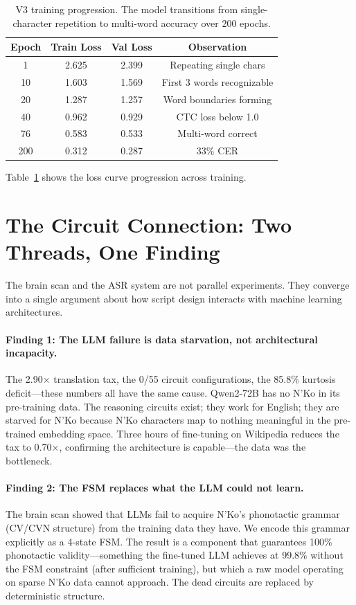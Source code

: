 \documentclass[11pt]{article}
\begin{document}
\begin{table}[t]
\centering
\small
\begin{tabular}{cccc}
\toprule
\textbf{Epoch} & \textbf{Train Loss} & \textbf{Val Loss} & \textbf{Observation} \\
\midrule
1 & 2.625 & 2.399 & Repeating single chars \\
10 & 1.603 & 1.569 & First 3 words recognizable \\
20 & 1.287 & 1.257 & Word boundaries forming \\
40 & 0.962 & 0.929 & CTC loss below 1.0 \\
76 & 0.583 & 0.533 & Multi-word correct \\
200 & 0.312 & 0.287 & 33\% CER \\
\bottomrule
\end{tabular}
\caption{V3 training progression. The model transitions from single-character repetition to multi-word accuracy over 200 epochs.}
\label{tab:loss-curve}
\end{table}

Table~\ref{tab:loss-curve} shows the loss curve progression across training.

\section{The Circuit Connection: Two Threads, One Finding}

The brain scan and the ASR system are not parallel experiments.
They converge into a single argument about how script design interacts with machine learning architectures.

\paragraph{Finding 1: The LLM failure is data starvation, not architectural incapacity.}
The 2.90$\times$ translation tax, the 0/55 circuit configurations, the 85.8\% kurtosis deficit---these numbers all have the same cause.
Qwen2-72B has no N'Ko in its pre-training data.
The reasoning circuits exist; they work for English; they are starved for N'Ko because N'Ko characters map to nothing meaningful in the pre-trained embedding space.
Three hours of fine-tuning on Wikipedia reduces the tax to 0.70$\times$, confirming the architecture is capable---the data was the bottleneck.

\paragraph{Finding 2: The FSM replaces what the LLM could not learn.}
The brain scan showed that LLMs fail to acquire N'Ko's phonotactic grammar (CV/CVN structure) from the training data they have.
We encode this grammar explicitly as a 4-state FSM.
The result is a component that guarantees 100\% phonotactic validity---something the fine-tuned LLM achieves at 99.8\% without the FSM constraint (after sufficient training), but which a raw model operating on sparse N'Ko data cannot approach.
The dead circuits are replaced by deterministic structure.
\end{document}
